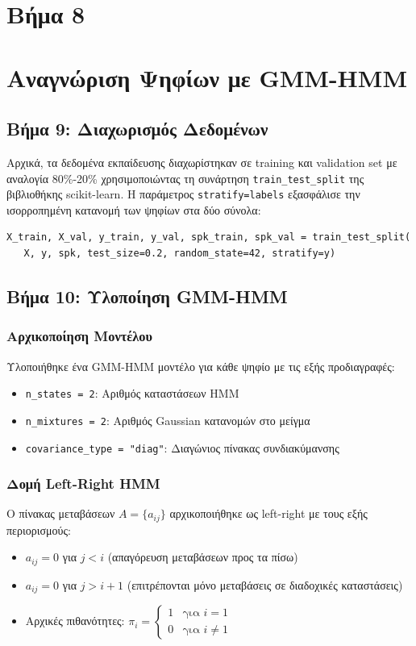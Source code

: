 \documentclass[a4paper,12pt]{article}
\begin{document}
\section*{Βήμα 8}




\section*{Αναγνώριση Ψηφίων με GMM-HMM}

\subsection*{Βήμα 9: Διαχωρισμός Δεδομένων}

Αρχικά, τα δεδομένα εκπαίδευσης διαχωρίστηκαν σε training και validation set με αναλογία 80\%-20\% χρησιμοποιώντας τη συνάρτηση \texttt{train\_test\_split} της βιβλιοθήκης scikit-learn. Η παράμετρος \texttt{stratify=labels} εξασφάλισε την ισορροπημένη κατανομή των ψηφίων στα δύο σύνολα:

\begin{verbatim}
X_train, X_val, y_train, y_val, spk_train, spk_val = train_test_split(
   X, y, spk, test_size=0.2, random_state=42, stratify=y)
\end{verbatim}

\subsection*{Βήμα 10: Υλοποίηση GMM-HMM}

\subsubsection*{Αρχικοποίηση Μοντέλου}
Υλοποιήθηκε ένα GMM-HMM μοντέλο για κάθε ψηφίο με τις εξής προδιαγραφές:

\begin{itemize}
   \item \texttt{n\_states = 2}: Αριθμός καταστάσεων HMM
   \item \texttt{n\_mixtures = 2}: Αριθμός Gaussian κατανομών στο μείγμα
   \item \texttt{covariance\_type = "diag"}: Διαγώνιος πίνακας συνδιακύμανσης
\end{itemize}

\subsubsection*{Δομή Left-Right HMM}
Ο πίνακας μεταβάσεων $A = \{a_{ij}\}$ αρχικοποιήθηκε ως left-right με τους εξής περιορισμούς:
\begin{itemize}
   \item $a_{ij} = 0$ για $j < i$ (απαγόρευση μεταβάσεων προς τα πίσω)
   \item $a_{ij} = 0$ για $j > i + 1$ (επιτρέπονται μόνο μεταβάσεις σε διαδοχικές καταστάσεις)
   \item Αρχικές πιθανότητες: $\pi_i = \begin{cases} 1 & \text{για } i = 1 \\ 0 & \text{για } i \neq 1 \end{cases}$
\end{itemize}
\end{document}
